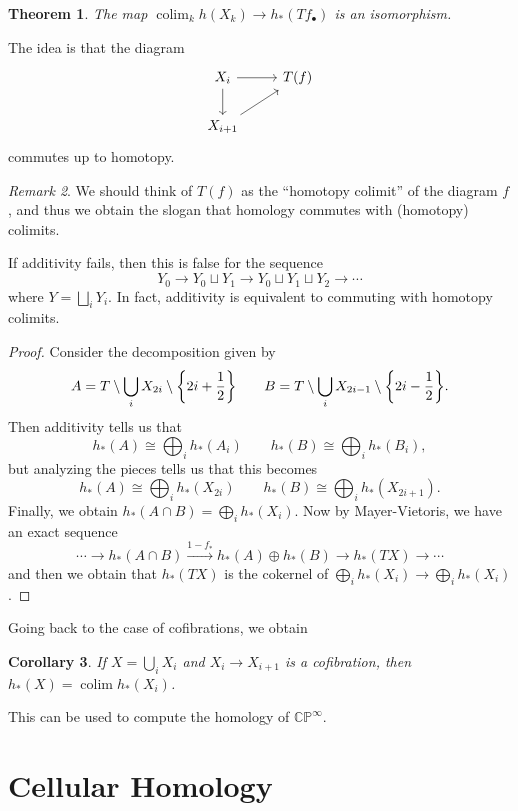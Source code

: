 \documentclass[leqno, openany]{memoir}
\newtheorem{thm}{Theorem}[section]
\newtheorem{cor}[thm]{Corollary}
\theoremstyle{definition}
\theoremstyle{remark}
\newtheorem{rmk}[thm]{Remark}
\theoremstyle{plain}
\theoremstyle{definition}
\theoremstyle{remark}
\newcommand{\C}{\mathbb{C}}
\renewcommand{\P}{\mathbb{P}}
\DeclareMathOperator{\colim}{colim}
\begin{document}
\begin{thm}
    The map $\colim_k h(X_k) \to h_*(Tf_{\bullet})$ is an isomorphism.
\end{thm}

The idea is that the diagram
\begin{equation*}
\begin{tikzcd}
    X_i \arrow{d} \arrow{r} & T(f) \\
    X_{i+1} \arrow{ur}
\end{tikzcd}
\end{equation*}
commutes up to homotopy. 

\begin{rmk}
    We should think of $T(f)$ as the ``homotopy colimit'' of the diagram $f$, and thus we obtain the slogan that homology commutes with (homotopy) colimits.
\end{rmk}

If additivity fails, then this is false for the sequence
\[ Y_0 \to Y_0 \sqcup Y_1 \to Y_0 \sqcup Y_1 \sqcup Y_2 \to \cdots \]
where $Y = \bigsqcup_i Y_i$. In fact, additivity is equivalent to commuting with homotopy colimits.

\begin{proof}
    Consider the decomposition given by
    \[ A = T \setminus \bigcup_i X_{2i} \setminus \qty{2i + \frac{1}{2}} \qquad B = T \setminus \bigcup_i X_{2i-1} \setminus \qty{2i - \frac{1}{2}}. \]
    Then additivity tells us that
    \[ h_*(A) \cong \bigoplus_i h_*(A_i) \qquad h_*(B) \cong \bigoplus_i h_*(B_i), \]
    but analyzing the pieces tells us that this becomes
    \[ h_*(A) \cong \bigoplus_i h_*(X_{2i}) \qquad h_*(B) \cong \bigoplus_i h_*(X_{2i+1}). \]
    Finally, we obtain $h_*(A \cap B) = \bigoplus_i h_*(X_i)$. Now by Mayer-Vietoris, we have an exact sequence
    \[ \cdots \to h_*(A \cap B) \xrightarrow{1-f_*} h_*(A) \oplus h_*(B) \to h_*(TX) \to \cdots \]
    and then we obtain that $h_*(TX)$ is the cokernel of $\bigoplus_i h_*(X_i) \to \bigoplus_i h_*(X_i)$.
\end{proof}

Going back to the case of cofibrations, we obtain
\begin{cor}
    If $X = \bigcup_i X_i$ and $X_i \to X_{i+1}$ is a cofibration, then $h_*(X) = \colim h_*(X_i)$.
\end{cor}

This can be used to compute the homology of $\C\P^{\infty}$.

\section{Cellular Homology}%
\label{sec:cellular_homology}
\end{document}
